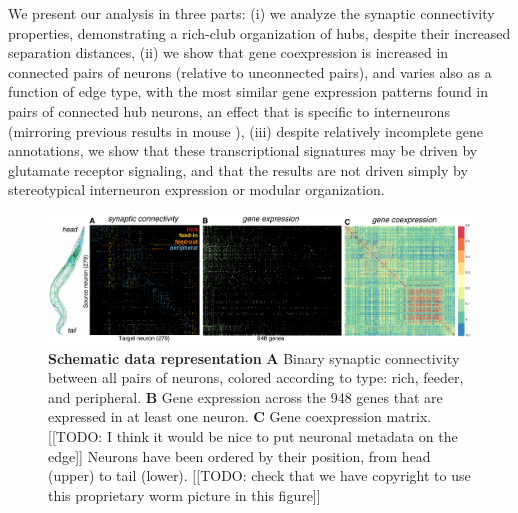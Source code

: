 \documentclass[10pt,letterpaper]{article}
\begin{document}
We present our analysis in three parts:
(i) we analyze the synaptic connectivity properties, demonstrating a rich-club organization of hubs, despite their increased separation distances,
(ii) we show that gene coexpression is increased in connected pairs of neurons (relative to unconnected pairs), and varies also as a function of edge type, with the most similar gene expression patterns found in pairs of connected hub neurons, an effect that is specific to interneurons (mirroring previous results in mouse \cite{Fulcher:2016ck}),
(iii) despite relatively incomplete gene annotations, we show that these transcriptional signatures may be driven by glutamate receptor signaling, and that the results are not driven simply by stereotypical interneuron expression or modular organization.

\begin{figure}[t]
  \centering
    \includegraphics[width=1\textwidth]{schematic.pdf}
 \caption{\textbf{Schematic data representation}
 \textbf{A} Binary synaptic connectivity between all pairs of neurons, colored according to type: rich, feeder, and peripheral.
  \textbf{B} Gene expression across the 948 genes that are expressed in at least one neuron.
 \textbf{C} Gene coexpression matrix.
[[TODO: I think it would be nice to put neuronal metadata on the edge]]
Neurons have been ordered by their position, from head (upper) to tail (lower).
[[TODO: check that we have copyright to use this proprietary worm picture in this figure]]
}
\label{fig:SchematicRepresentation}
\end{figure}
\end{document}
